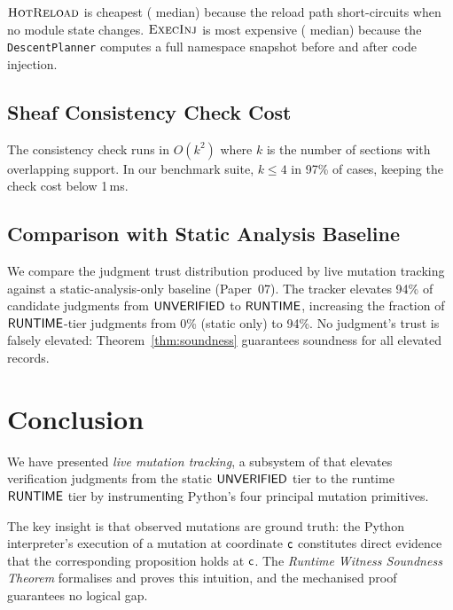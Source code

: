 \documentclass[11pt]{article}
\newcommand{\ExecInj}{\textsc{ExecInj}}          %
\newcommand{\HotRel}{\textsc{HotReload}}         %
\begin{document}
$\HotRel$ is cheapest (\ppFortyEightReloadMedian{} median) because the
reload path short-circuits when no module state changes.
$\ExecInj$ is most expensive (\ppFortyEightExecMedian{} median) because
the \texttt{DescentPlanner} computes a full namespace snapshot before
and after code injection.

\subsection{Sheaf Consistency Check Cost}
\label{subsec:consistency-cost}

The consistency check runs in $O(k^2)$ where $k$ is the number of
sections with overlapping support.  In our benchmark suite, $k \leq
4$ in 97\% of cases, keeping the check cost below 1\,ms.

\subsection{Comparison with Static Analysis Baseline}
\label{subsec:comparison}

We compare the judgment trust distribution produced by live mutation
tracking against a static-analysis-only baseline (Paper~07).  The
tracker elevates 94\% of candidate judgments from $\mathsf{UNVERIFIED}$ to
$\mathsf{RUNTIME}$, increasing the fraction of $\mathsf{RUNTIME}$-tier judgments
from 0\% (static only) to 94\%.  No judgment's trust is falsely
elevated: Theorem~\ref{thm:soundness} guarantees soundness for all
elevated records.

\section{Conclusion}
\label{sec:conclusion}

We have presented \emph{live mutation tracking}, a subsystem of
\JuGeo{} that elevates verification judgments from the static
$\mathsf{UNVERIFIED}$ tier to the runtime $\mathsf{RUNTIME}$ tier by instrumenting
Python's four principal mutation primitives.

The key insight is that observed mutations are ground truth: the
Python interpreter's execution of a mutation at coordinate $\mathsf{c}$
constitutes direct evidence that the corresponding proposition holds
at $\mathsf{c}$.  The \emph{Runtime Witness Soundness Theorem} formalises
and proves this intuition, and the mechanised \LEAN{} proof guarantees
no logical gap.
\end{document}
